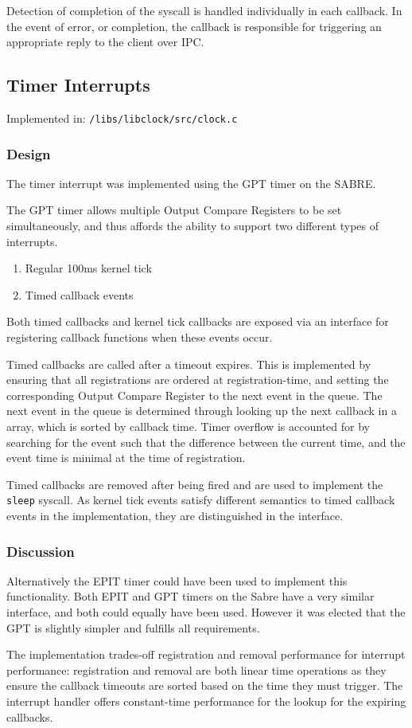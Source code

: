 \documentclass[a4paper,12pt]{article}
\begin{document}
Detection of completion of the syscall is handled individually in each
callback.  In the event of error, or completion, the callback is responsible
for triggering an appropriate reply to the client over IPC.

\subsection{Timer Interrupts}
Implemented in: \texttt{/libs/libclock/src/clock.c}

\subsubsection{Design}
The timer interrupt was implemented using the GPT timer on the SABRE.

The GPT timer allows multiple Output Compare Registers to be set
simultaneously, and thus affords the ability to support two different types of
interrupts.

\begin{enumerate}
\item Regular 100ms kernel tick
\item Timed callback events
\end{enumerate}

Both timed callbacks and kernel tick callbacks are exposed via an interface
for registering callback functions when these events occur.

Timed callbacks are called after a timeout expires.  This is implemented by
ensuring that all registrations are ordered at registration-time, and setting
the corresponding Output Compare Register to the next event in the queue.  The
next event in the queue is determined through looking up the next callback in
a array, which is sorted by callback time.  Timer overflow is accounted for by
searching for the event such that the difference between the current time, and
the event time is minimal at the time of registration.

Timed callbacks are removed after being fired and are used to implement the
\texttt{sleep} syscall.  As kernel tick events satisfy different semantics to
timed callback events in the implementation, they are distinguished in the
interface.

\subsubsection{Discussion}
Alternatively the EPIT timer could have been used to implement this
functionality.  Both EPIT and GPT timers on the Sabre have a very similar
interface, and both could equally have been used.  However it was elected that
the GPT is slightly simpler and fulfills all requirements.

The implementation trades-off registration and removal performance for
interrupt performance: registration and removal are both linear time
operations as they ensure the callback timeouts are sorted based on the time
they must trigger.  The interrupt handler offers constant-time performance for
the lookup for the expiring callbacks.
\end{document}
